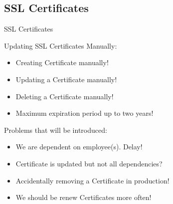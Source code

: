 \subsection{SSL Certificates}\label{subsec:minimal-requirements-ssl-certificates}
\begin{frame}{SSL Certificates}
	\begin{alertblock}{Updating SSL Certificates Manually:}
		\begin{itemize}
			\item<1-| alert@1> Creating Certificate \alert{manually}!
			\item<2-| alert@2> Updating a Certificate \alert{manually}!
			\item<3-| alert@3> Deleting a Certificate \alert{manually}!
			\item<4-| alert@4> \alert{Maximum expiration period up to two years}!
		\end{itemize}	
	\end{alertblock}
	\begin{exampleblock}{Problems that will be introduced:}
		\begin{itemize}
			\item<1-| alert@1> We are dependent on employee(s). \alert{Delay}!
			\item<2-| alert@2> Certificate is updated \alert{but not all dependencies}?
			\item<3-| alert@3> Accidentally removing a \alert{Certificate} in production!
			\item<4-| alert@4> We should be renew \alert{Certificates} more often!
		\end{itemize}	
	\end{exampleblock}
\end{frame}

